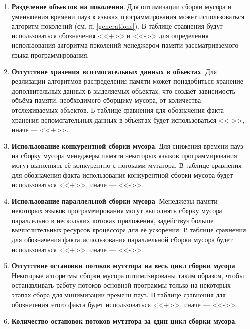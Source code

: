 \begin{enumerate}[label*=\arabic*.]
	\item \textbf{Разделение объектов на поколения}. \newline
	Для оптимизации сборки мусора и уменьшения времени пауз в языках программирования может использоваться алгоритм поколений (см. п. \ref{generations}). В таблице сравнения будут использоваться обозначения <<+>> и <<->> для определения использования алгоритма поколений менеджером памяти рассматриваемого языка программирования.
	
	\item \textbf{Отсутствие хранения вспомогательных данных в объектах}. \newline
	Для реализации алгоритмов распределения памяти может понадобиться хранение дополнительных данных в выделяемых объектах, что создаёт зависимость объёма памяти, необходимого сборщику мусора, от количества отслеживаемых объектов. В таблице сравнения для обозначения факта хранения вспомогательных данных в объектах будет использоваться <<->>, иначе --- <<+>>.
	
	\item \textbf{Использование конкурентной сборки мусора}. \newline
	Для снижения времени пауз на сборку мусора менеджеры памяти некоторых языков программирования могут выполнять её конкурентно с потоками мутатора. В таблице сравнения для обозначения факта использования конкурентной сборки мусора будет использоваться <<+>>, иначе --- <<->>.
	
	\item \textbf{Использование параллельной сборки мусора}. \newline
	Менеджеры памяти некоторых языков программирования могут выполнять сборку мусора параллельно в нескольких потоках приложения, задействуя больше вычислительных ресурсов процессора для её ускорения. В таблице сравнения для обозначения факта использования параллельной сборки мусора будет использоваться <<+>>, иначе --- <<->>.
	
	\item \textbf{Отсутствие остановки потоков мутатора на весь цикл сборки мусора}. \newline
	Некоторые алгоритмы сборки мусора оптимизированы таким образом, чтобы останавливать работу потоков основной программы только на некоторых этапах сбора для минимизации времени пауз. В таблице сравнения для обозначения этого факта будет использоваться <<+>>, иначе --- <<->>.
	
	\item \textbf{Количество остановок потоков мутатора за один цикл сборки мусора}.
\end{enumerate}

